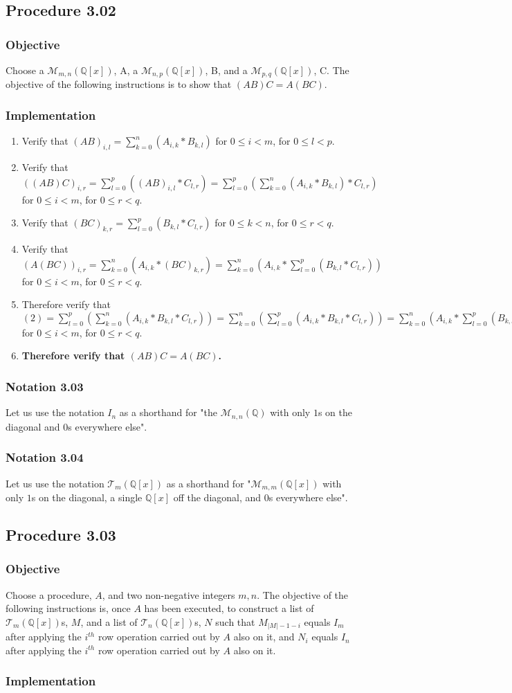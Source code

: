 \documentclass[twocolumn]{article}
\newcommand{\notation}[1]{\subsubsection*{Notation #1}}
\newcommand{\procedure}[2][]{\subsection*{Procedure #2 \ifthenelse{\equal{#1}{}}{}{(#1)}}\label{sec:procedure #2}}
\newcommand{\objective}{\subsubsection*{Objective}}
\newcommand{\implementation}{\subsubsection*{Implementation}}
\begin{document}
		\procedure{3.02}
			\objective
				Choose a $\mathcal{M}_{m,n}(\mathbb{Q}[x])$, A, a $\mathcal{M}_{n,p}(\mathbb{Q}[x])$, B, and a $\mathcal{M}_{p,q}(\mathbb{Q}[x])$, C. The objective of the following instructions is to show that $(AB)C=A(BC)$.
			\implementation
				\begin{enumerate}
					\item Verify that $(AB)_{i,l}=\sum_{k=0}^{n} \left(A_{i,k}*B_{k,l}\right)$ for $0\le i<m$, for $0\le l<p$.
					\item Verify that $((AB)C)_{i,r}=\sum_{l=0}^{p} \left((AB)_{i,l}*C_{l,r}\right)=\sum_{l=0}^{p} \left(\sum_{k=0}^{n} \left(A_{i,k}*B_{k,l}\right)*C_{l,r}\right)$ for $0\le i<m$, for $0\le r<q$.
					\item Verify that $(BC)_{k,r}=\sum_{l=0}^{p}\left(B_{k,l}*C_{l,r}\right)$ for $0\le k<n$, for $0\le r<q$.
					\item Verify that $(A(BC))_{i,r}=\sum_{k=0}^{n}\left(A_{i,k}*(BC)_{k,r}\right)=\sum_{k=0}^{n}\left(A_{i,k}*\sum_{l=0}^{p}\left(B_{k,l}*C_{l,r}\right)\right)$ for $0\le i<m$, for $0\le r<q$.
					\item Therefore verify that $(2)=\sum_{l=0}^{p} \left(\sum_{k=0}^{n} \left(A_{i,k}*B_{k,l}*C_{l,r}\right)\right)=\sum_{k=0}^{n} \left(\sum_{l=0}^{p} \left(A_{i,k}*B_{k,l}*C_{l,r}\right)\right)=\sum_{k=0}^{n}\left(A_{i,k}*\sum_{l=0}^{p}\left(B_{k,l}*C_{l,r}\right)\right)=(4)$ for $0\le i<m$, for $0\le r<q$.
					\item \textbf{Therefore verify that $(AB)C=A(BC)$.}
				\end{enumerate}
		\notation{3.03}
			Let us use the notation $I_n$ as a shorthand for "the $\mathcal{M}_{n,n}(\mathbb{Q})$ with only $1$s on the diagonal and $0$s everywhere else".
		\notation{3.04}
			Let us use the notation $\mathcal{T}_{m}(\mathbb{Q}[x])$ as a shorthand for "$\mathcal{M}_{m,m}(\mathbb{Q}[x])$ with only $1$s on the diagonal, a single $\mathbb{Q}[x]$ off the diagonal, and $0$s everywhere else".
		\procedure{3.03}
			\objective
				Choose a procedure, $A$, and two non-negative integers $m,n$. The objective of the following instructions is, once $A$ has been executed, to construct a list of $\mathcal{T}_{m}(\mathbb{Q}[x])$s, $M$, and a list of $\mathcal{T}_{n}(\mathbb{Q}[x])$s, $N$ such that $M_{\lvert M\rvert-1-i}$ equals $I_m$ after applying the $i^{th}$ row operation carried out by $A$ also on it, and $N_i$ equals $I_n$ after applying the $i^{th}$ row operation carried out by $A$ also on it.
			\implementation
\end{document}
